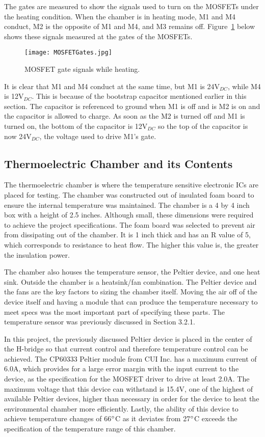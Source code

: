 \documentclass[11pt,letter]{article}
\begin{document}
The gates are measured to show the signals used to turn on the MOSFETs under the heating condition. When the chamber is in heating mode, M1 and M4 conduct, M2 is the opposite of M1 and M4, and M3 remains off. Figure~\ref{fig:mosfetgates} below shows these signals measured at the gates of the MOSFETs.

\begin{figure}[H]
    \centering
    \texttt{[image: MOSFETGates.jpg]}
    \caption{MOSFET gate signals while heating.}
    \label{fig:mosfetgates}
\end{figure}

It is clear that M1 and M4 conduct at the same time, but M1 is 24V$_{DC}$, while M4 is 12V$_{DC}$. This is because of the bootstrap capacitor mentioned earlier in this section. The capacitor is referenced to ground when M1 is off and is M2 is on and the capacitor is allowed to charge. As soon as the M2 is turned off and M1 is turned on, the bottom of the capacitor is 12V$_{DC}$ so the top of the capacitor is now 24V$_{DC}$, the voltage used to drive M1's gate.

\subsection{Thermoelectric Chamber and its Contents}

The thermoelectric chamber is where the temperature sensitive electronic ICs are placed for testing. The chamber was constructed out of insulated foam board to ensure the internal temperature was maintained. The chamber is a 4 by 4 inch box with a height of 2.5 inches. Although small, these dimensions were required to achieve the project specifications. The foam board was selected to prevent air from dissipating out of the chamber. It is 1 inch thick and has an R value of 5, which corresponds to resistance to heat flow. The higher this value is, the greater the insulation power.

The chamber also houses the temperature sensor, the Peltier device, and one heat sink. Outside the chamber is a heatsink/fan combination. The Peltier device and the fans are the key factors to sizing the chamber itself. Moving the air off of the device itself and having a module that can produce the temperature necessary to meet specs was the most important part of specifying these parts. The temperature sensor was previously discussed in Section 3.2.1.

In this project, the previously discussed Peltier device is placed in the center of the H-bridge so that current control and therefore temperature control can be achieved. The CP60333 Peltier module from CUI Inc. has a maximum current of 6.0A, which provides for a large error margin with the input current to the device, as the specification for the MOSFET driver to drive at least 2.0A. The maximum voltage that this device can withstand is 15.4V, one of the highest of available Peltier devices, higher than necessary in order for the device to heat the environmental chamber more efficiently. Lastly, the ability of this device to achieve temperature changes of 66$\degree$C as it deviates from 27$\degree$C exceeds the specification of the temperature range of this chamber.
\end{document}
